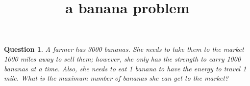 \documentclass[12pt]{article}
\title{a banana problem}
\theoremstyle{plain}
\newtheorem{QQ}{Question}
\begin{document}
\maketitle

\begin{QQ}
A farmer has 3000 bananas. She needs to take them to the market 1000 miles away to sell them;
however, she only has the strength to carry 1000 bananas at a time. Also, she needs to eat 1 banana
to have the energy to travel 1 mile. What is the maximum number of bananas she can get to the
market?
\end{QQ}
\end{document}
